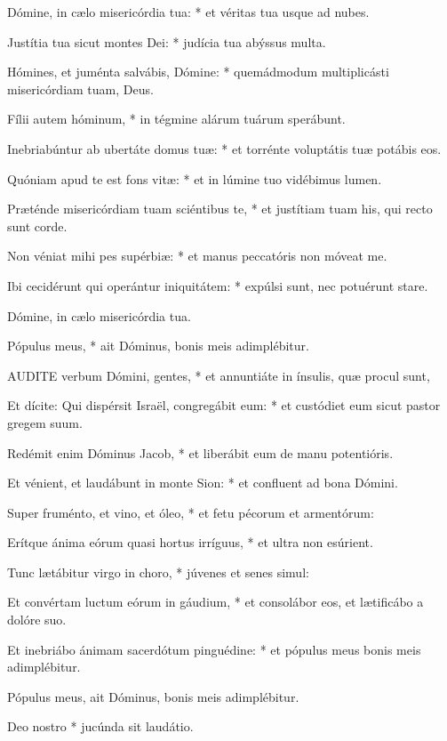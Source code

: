 Dómine, in cælo misericórdia tua: * et véritas tua usque ad nubes.

Justítia tua sicut montes Dei: * judícia tua abýssus multa.

Hómines, et juménta salvábis, Dómine: * quemádmodum multiplicásti misericórdiam tuam, Deus.

Fílii autem hóminum, * in tégmine alárum tuárum sperábunt.

Inebriabúntur ab ubertáte domus tuæ: * et torrénte voluptátis tuæ potábis eos.

Quóniam apud te est fons vitæ: * et in lúmine tuo vidébimus lumen.

Præténde misericórdiam tuam sciéntibus te, * et justítiam tuam his, qui recto sunt corde.

Non véniat mihi pes supérbiæ: * et manus peccatóris non móveat me.

Ibi cecidérunt qui operántur iniquitátem: * expúlsi sunt, nec potuérunt stare.

 Dómine, in cælo misericórdia tua.

 Pópulus meus, * ait Dóminus, bonis meis adimplébitur.


\lettrine[lines=2]{A}{UDITE} verbum Dómini, gentes, * et annuntiáte in ínsulis, quæ procul sunt,

Et dícite: Qui dispérsit Israël, congregábit eum: * et custódiet eum sicut pastor gregem suum.

Redémit enim Dóminus Jacob, * et liberábit eum de manu potentióris.

Et vénient, et laudábunt in monte Sion: * et confluent ad bona Dómini.

Super fruménto, et vino, et óleo, * et fetu pécorum et armentórum:

Erítque ánima eórum quasi hortus irríguus, * et ultra non esúrient.

Tunc lætábitur virgo in choro, * júvenes et senes simul:

Et convértam luctum eórum in gáudium, * et consolábor eos, et lætificábo a dolóre suo.

Et inebriábo ánimam sacerdótum pinguédine: * et pópulus meus bonis meis adimplébitur.

 Pópulus meus, ait Dóminus, bonis meis adimplébitur.

 Deo nostro * jucúnda sit laudátio.


